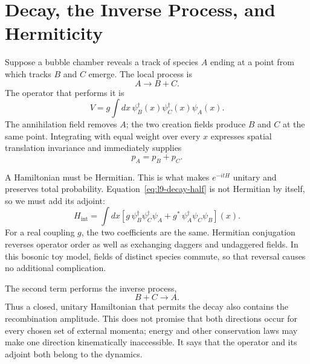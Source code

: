 \section{Decay, the Inverse Process, and Hermiticity}

Suppose a bubble chamber reveals a track of species \(A\) ending at a point from which tracks \(B\) and \(C\) emerge. The local process is
\begin{equation}
A\longrightarrow B+C.
\end{equation}
The operator that performs it is
\begin{equation}
V=g\int dx\,
\psi_B^\dagger(x)\psi_C^\dagger(x)\psi_A(x).
\label{eq:l9-decay-half}
\end{equation}
The annihilation field removes \(A\); the two creation fields produce \(B\) and \(C\) at the same point. Integrating with equal weight over every \(x\) expresses spatial translation invariance and immediately supplies
\begin{equation}
p_A=p_B+p_C.
\end{equation}

A Hamiltonian must be Hermitian. This is what makes \(e^{-itH}\) unitary and preserves total probability. Equation~\eqref{eq:l9-decay-half} is not Hermitian by itself, so we must add its adjoint:
\begin{equation}
H_{\mathrm{int}}
=\int dx\left[
g\,\psi_B^\dagger\psi_C^\dagger\psi_A
+g^*\,\psi_A^\dagger\psi_C\psi_B
\right](x).
\label{eq:l9-hermitian-vertex}
\end{equation}
For a real coupling \(g\), the two coefficients are the same. Hermitian conjugation reverses operator order as well as exchanging daggers and undaggered fields. In this bosonic toy model, fields of distinct species commute, so that reversal causes no additional complication.

The second term performs the inverse process,
\begin{equation}
B+C\longrightarrow A.
\end{equation}
Thus a closed, unitary Hamiltonian that permits the decay also contains the recombination amplitude. This does not promise that both directions occur for every chosen set of external momenta; energy and other conservation laws may make one direction kinematically inaccessible. It says that the operator and its adjoint both belong to the dynamics.

\begin{classroomqa}
\end{classroomqa}

